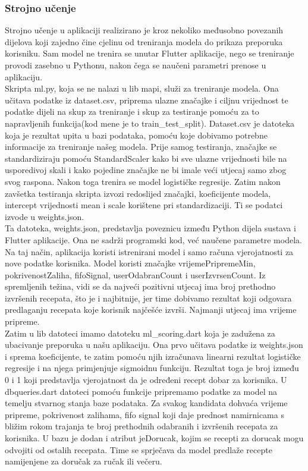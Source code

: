 \documentclass[diplomskirad]{fer}
\begin{document}
\subsubsection{Strojno učenje}
Strojno učenje u aplikaciji realizirano je kroz nekoliko međusobno povezanih dijelova koji zajedno čine cjelinu od treniranja modela do prikaza preporuka korisniku. Sam model ne trenira se unutar Flutter aplikacije, nego se treniranje provodi zasebno u Pythonu, nakon čega se naučeni parametri prenose u aplikaciju.
\\
Skripta ml.py, koja se ne nalazi u lib mapi, služi za treniranje modela. Ona učitava podatke iz dataset.csv, priprema ulazne značajke i ciljnu vrijednost te podatke dijeli na skup za treniranje i skup za testiranje pomoću za to napravljenih funkcija(kod mene je to train\_test\_split). Dataset.csv je datoteka koja je rezultat upita u bazi podataka, pomoću koje dobivamo potrebne informacije za treniranje našeg modela. Prije samog testiranja, značajke se standardiziraju pomoću StandardScaler kako bi sve ulazne vrijednosti bile na usporedivoj skali i kako pojedine značajke ne bi imale veći utjecaj samo zbog svog raspona. Nakon toga trenira se model logističke regresije. Zatim nakon zavšetka testiranja skripta izvozi redoslijed značajki, koeficijente modela, intercept vrijednosti mean i scale korištene pri standardizaciji. Ti se podatci izvode u weights.json.
\\ Ta datoteka, weights.json, predstavlja poveznicu između Python dijela sustava i Flutter aplikacije. Ona ne sadrži programski kod, već naučene parametre modela. Na taj način, aplikacija koristi istrenirani model i samo računa vjerojatnosti za nove podatke korisnika. Model koristi značajke vrijemePripremeMin, pokrivenostZaliha, fifoSignal, userOdabranCount i userIzvrsenCount. Iz spremljenih težina, vidi se da najveći pozitivni utjecaj ima broj prethodno izvršenih recepata, što je i najbitnije, jer time dobivamo rezultat koji odgovara predlaganju recepata koje korisnik najčešće izvrši. Najmanji utjecaj ima vrijeme pripreme.
\\
Zatim u lib datoteci imamo datoteku ml\_scoring.dart koja je zadužena za ubacivanje preporuka u našu aplikaciju. Ona prvo učitava podatke iz weights.json i sprema koeficijente, te zatim pomoću njih izračunava linearni rezultat logističke regresije i na njega primjenjuje sigmoidnu funkciju. Rezultat toga je broj između 0 i 1 koji predstavlja vjerojatnost da je određeni recept dobar za korisnika. U dbqueries.dart datoteci pomoću funkcije pripremamo podatke za model na temelju stvarnog stanja baze podataka. Za svakog kandidata dohvaća vrijeme pripreme, pokrivenost zalihama, fifo signal koji daje prednost namirnicama s bližim rokom trajanja te broj prethodnih odabranih i izvršenih recepata za korisnika. U bazu je dodan i atribut jeDorucak, kojim se recepti za dorucak mogu odvojiti od ostalih recepata. Time se sprječava da model predlaže recepte namijenjene za doručak za ručak ili večeru. 
\end{document}
